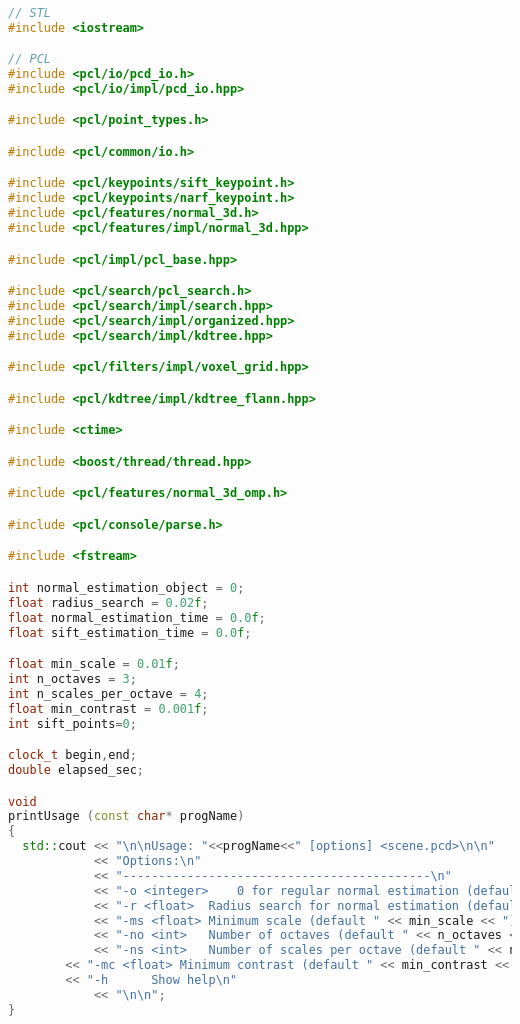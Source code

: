 \begin{lstlisting}[language=C++,breaklines]

// STL
#include <iostream>

// PCL
#include <pcl/io/pcd_io.h>
#include <pcl/io/impl/pcd_io.hpp>

#include <pcl/point_types.h>

#include <pcl/common/io.h>

#include <pcl/keypoints/sift_keypoint.h>
#include <pcl/keypoints/narf_keypoint.h>
#include <pcl/features/normal_3d.h>
#include <pcl/features/impl/normal_3d.hpp>

#include <pcl/impl/pcl_base.hpp>

#include <pcl/search/pcl_search.h>
#include <pcl/search/impl/search.hpp>
#include <pcl/search/impl/organized.hpp>
#include <pcl/search/impl/kdtree.hpp>

#include <pcl/filters/impl/voxel_grid.hpp>

#include <pcl/kdtree/impl/kdtree_flann.hpp>

#include <ctime>

#include <boost/thread/thread.hpp>

#include <pcl/features/normal_3d_omp.h>

#include <pcl/console/parse.h>

#include <fstream>

int normal_estimation_object = 0;
float radius_search = 0.02f;
float normal_estimation_time = 0.0f;
float sift_estimation_time = 0.0f;

float min_scale = 0.01f;
int n_octaves = 3;
int n_scales_per_octave = 4;
float min_contrast = 0.001f;
int sift_points=0; 

clock_t begin,end;
double elapsed_sec;

void 
printUsage (const char* progName)
{
  std::cout << "\n\nUsage: "<<progName<<" [options] <scene.pcd>\n\n"
            << "Options:\n"
            << "-------------------------------------------\n"
            << "-o <integer>	0 for regular normal estimation (default), 1 for enhanced normal estimation\n"
            << "-r <float>	Radius search for normal estimation (default "<< radius_search<<")\n"
            << "-ms <float>	Minimum scale (default " << min_scale << ")\n"
            << "-no <int>	Number of octaves (default " << n_octaves << ")\n"
            << "-ns <int>	Number of scales per octave (default " << n_scales_per_octave << ")\n"
	    << "-mc <float>	Minimum contrast (default " << min_contrast << ")\n"
	    << "-h		Show help\n"
            << "\n\n";
}


\end{lstlisting}
